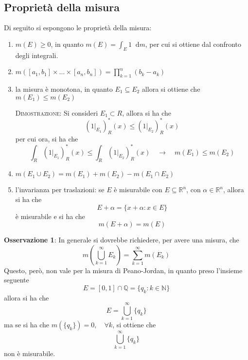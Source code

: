 \documentclass[a4paper]{extarticle}
\newcommand*\dif{\mathop{}\!\mathrm{d}}
\begin{document}
\vspace{1em}
\subsection{Proprietà della misura}
Di seguito si espongono le proprietà della misura:
\begin{enumerate}
    \item $m(E) \geq 0$, in quanto $m(E) = \int_E 1 \dif m$, per cui si ottiene dal confronto degli integrali.
    
    \item $\displaystyle{m([a_1,b_1] \times \dots \times [a_n,b_n]) = \prod_{k=1}^n (b_k-a_k)}$
    
    \item la misura è monotona, in quanto $E_1 \subseteq E_2$ allora si ottiene che $m(E_1) \leq m(E_2)$
    
    \vspace{2em}
    \noindent
    \normalfont \normalsize
    \textsc{Dimostrazione}: Si consideri $E_1 \subset R$, allora si ha che
    \[(1 \vert_{E_1})_R^*(x) \leq (1 \vert_{E_2})_R^*(x)\]
    per cui ora, si ha che
    \[\int_R (1 \vert_{E_1})_R^*(x) \leq \int_R (1 \vert_{E_2})_R^*(x) \hspace{1em} \rightarrow \hspace{1em} m(E_1) \leq m(E_2)\]

    \item $m(E_1 \cup E_2) = m(E_1) + m(E_2) - m(E_1 \cap E_2)$
    
    \item l'invarianza per traslazioni: se $E$ è misurabile con $E \subseteq \mathbb{R}^n$, con $\alpha \in \mathbb{R}^n$, allora si ha che
    \[E + \alpha = \{x+\alpha : x \in E\}\]
    è misurabile e si ha che
    \[m(E+\alpha) = m(E)\]
\end{enumerate}

\vspace{2em}
\noindent
\textbf{Osservazione 1}: In generale si dovrebbe richiedere, per avere una misura, che
\[m \left(\bigcup_{k=1}^\infty E_k\right) = \sum_{k=1}^\infty m(E_k)\]
Questo, però, non vale per la misura di Peano-Jordan, in quanto preso l'insieme seguente
\[E = [0,1] \cap \mathbb{Q} = \{q_k : k \in \mathbb{N}\}\]
allora si ha che
\[E = \bigcup_{k=1}^\infty \{q_k\}\]
ma se si ha che $m(\{q_k\}) = 0, \hspace{1em} \forall k$, si ottiene che
\[\bigcup_{k=1}^\infty \{q_k\}\]
non è misurabile.
\end{document}
